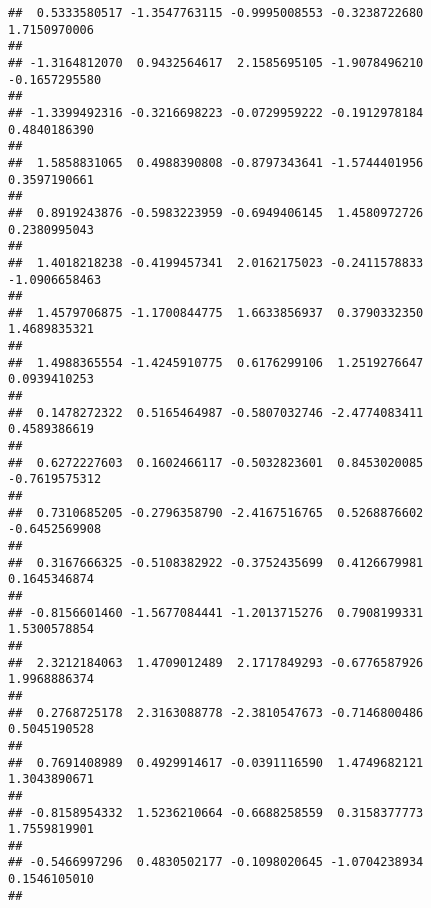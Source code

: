 \documentclass[]{article}
\begin{document}
\begin{verbatim}
##  0.5333580517 -1.3547763115 -0.9995008553 -0.3238722680  1.7150970006 
##                                                                       
## -1.3164812070  0.9432564617  2.1585695105 -1.9078496210 -0.1657295580 
##                                                                       
## -1.3399492316 -0.3216698223 -0.0729959222 -0.1912978184  0.4840186390 
##                                                                       
##  1.5858831065  0.4988390808 -0.8797343641 -1.5744401956  0.3597190661 
##                                                                       
##  0.8919243876 -0.5983223959 -0.6949406145  1.4580972726  0.2380995043 
##                                                                       
##  1.4018218238 -0.4199457341  2.0162175023 -0.2411578833 -1.0906658463 
##                                                                       
##  1.4579706875 -1.1700844775  1.6633856937  0.3790332350  1.4689835321 
##                                                                       
##  1.4988365554 -1.4245910775  0.6176299106  1.2519276647  0.0939410253 
##                                                                       
##  0.1478272322  0.5165464987 -0.5807032746 -2.4774083411  0.4589386619 
##                                                                       
##  0.6272227603  0.1602466117 -0.5032823601  0.8453020085 -0.7619575312 
##                                                                       
##  0.7310685205 -0.2796358790 -2.4167516765  0.5268876602 -0.6452569908 
##                                                                       
##  0.3167666325 -0.5108382922 -0.3752435699  0.4126679981  0.1645346874 
##                                                                       
## -0.8156601460 -1.5677084441 -1.2013715276  0.7908199331  1.5300578854 
##                                                                       
##  2.3212184063  1.4709012489  2.1717849293 -0.6776587926  1.9968886374 
##                                                                       
##  0.2768725178  2.3163088778 -2.3810547673 -0.7146800486  0.5045190528 
##                                                                       
##  0.7691408989  0.4929914617 -0.0391116590  1.4749682121  1.3043890671 
##                                                                       
## -0.8158954332  1.5236210664 -0.6688258559  0.3158377773  1.7559819901 
##                                                                       
## -0.5466997296  0.4830502177 -0.1098020645 -1.0704238934  0.1546105010 
##                                                                       

\end{verbatim}
\end{document}
